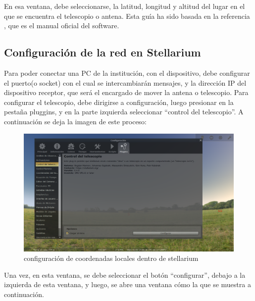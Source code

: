 En esa ventana, debe seleccionarse, la latitud, longitud y altitud del lugar en el que se encuentra el telescopio o antena. Esta guía ha sido basada en la referencia \cite{mgpredict}, que es el manual oficial del software. 

\subsection{Configuración de la red en Stellarium} \label{sub:conf_stellarium_red}


Para poder conectar una PC de la institución, con el dispositivo, debe configurar el puerto(o socket) con el cual se intercambiarán mensajes, y la dirección IP del dispositivo receptor, que será el encargado de mover la antena o telescopio. Para configurar el telescopio, debe dirigirse a configuración, luego presionar en la pestaña pluggins, y en la parte izquierda seleccionar ``control del telescopio''. A continuación se deja la imagen de este proceso: 
 
\begin{figure}[h]
	\includegraphics[width=\textwidth]{conf_tel_red1} 
	\caption{configuración de coordenadas locales dentro de stellarium} 
	\label{fig:stell_conf_red}
\end{figure}

Una vez, en esta ventana, se debe seleccionar el botón ``configurar'', debajo a la izquierda de esta ventana, y luego, se abre una ventana cómo la que se muestra a continuación. 

